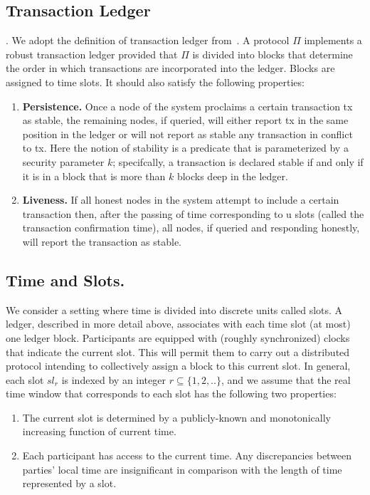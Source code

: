 \subsection{Transaction Ledger}\label{subsec:transaction-ledger}.
We adopt the definition of transaction ledger from~\cite{cryptoeprint:2016/889}.
A protocol $\Pi$ implements a robust transaction ledger provided that $\Pi$ is divided into blocks that determine the order in which transactions are incorporated into the ledger.
Blocks are assigned to time slots.
It should also satisfy the following properties:
\begin{enumerate}
    \item \textbf{Persistence.} Once a node of the system proclaims a certain transaction tx as stable, the remaining
    nodes, if queried, will either report tx in the same position in the ledger or will not report as stable any transaction in conflict to tx.
    Here the notion of stability is a predicate that is parameterized by a security parameter $k$; specifcally, a transaction is declared stable if and only if it is in a block that is more than $k$ blocks deep in the ledger.
    \item \textbf{Liveness.} If all honest nodes in the system attempt to include a certain transaction then, after the passing of time corresponding to u slots (called the transaction confirmation time), all nodes, if queried and responding honestly, will report the transaction as stable.
\end{enumerate}

\subsection{Time and Slots.}\label{subsec:time-and-slots.}
We consider a setting where time is divided into discrete units called slots.
A ledger, described in more detail above, associates with each time slot (at most) one ledger block.
Participants are equipped with (roughly synchronized) clocks that indicate the current slot.
This will permit them to carry out a distributed protocol intending to collectively assign a block to this current
slot.
In general, each slot $sl_r$ is indexed by an integer $r \subseteq \{1, 2, ..\}$, and we assume that the real
time window that corresponds to each slot has the following two properties:
\begin{enumerate}
    \item The current slot is determined by a publicly-known and monotonically increasing function of current time.
    \item Each participant has access to the current time.
    Any discrepancies between parties' local time are insignificant in comparison with the length of time represented by a slot.
\end{enumerate}

